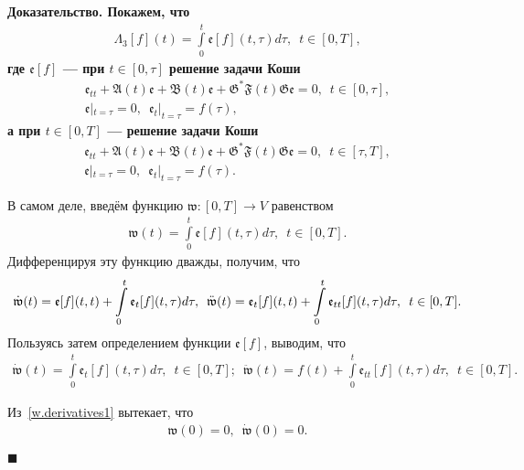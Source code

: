 \documentclass{report}
\newenvironment{Proof}{\par\noindent\bf Доказательство.\rm}{ $\blacksquare$\par}
\begin{document}
\begin{Proof}
Покажем, что
\begin{gather}\label{Lambda.3.repres}
\Lambda_3[f](t)=\int\limits_0^t\mathfrak{e}[f](t,\tau)d\tau,\,\,\,t\in[0,T],
\end{gather}
где $\mathfrak{e}[f]$ ---  при $t\in[0,\tau]$ решение задачи Коши
\begin{gather}\label{abstrChauchyprobeq:nonaut:parametric:homogenious.eq.e!t.less.than.tau}
{\mathfrak{e}}_{tt}+\mathfrak{A}(t){\mathfrak{e}}+\mathfrak{B}(t){\mathfrak{e}} + \mathfrak{G}^*\mathfrak{F}(t)\mathfrak{G}{\mathfrak{e}} = 0,\,\,\,t\in[0,\tau],\\
\label{abstrChauchyprobinitcond:nonaut:parametric:homogenious.eq.e!t.less.than.tau}
{\mathfrak{e}}|_{t=\tau}=0,\,\,\,{\mathfrak{e}}_t|_{t=\tau}=f(\tau),
\end{gather}
а при $t\in[0,T]$ --- решение задачи Коши
\begin{gather}\label{abstrChauchyprobeq:nonaut:parametric:homogenious.eq.e!t.greater.than.tau}
{\mathfrak{e}}_{tt}+\mathfrak{A}(t){\mathfrak{e}}+\mathfrak{B}(t){\mathfrak{e}} + \mathfrak{G}^*\mathfrak{F}(t)\mathfrak{G}{\mathfrak{e}} = 0,\,\,\,t\in[\tau,T],\\
\label{abstrChauchyprobinitcond:nonaut:parametric:homogenious.eq.e!t.greater.than.tau}
{\mathfrak{e}}|_{t=\tau}=0,\,\,\,{\mathfrak{e}}_t|_{t=\tau}=f(\tau).
\end{gather}

В самом деле, введём функцию $\mathfrak{w}:[0,T]\to V$ равенством
\begin{gather*}
\mathfrak{w}(t)=\int\limits_0^t\mathfrak{e}[f](t,\tau)d\tau,\,\,\,t\in[0,T].
\end{gather*}
Дифференцируя эту функцию дважды, получим, что
\begin{gather*}
\dot{\mathfrak{w}}(t)=\mathfrak{e}[f](t,t)+\int\limits_0^t\mathfrak{e}_t[f](t,\tau)d\tau,\,\,\,
\notag\ddot{\mathfrak{w}}(t)=\mathfrak{e}_t[f](t,t)+\int\limits_0^t\mathfrak{e}_{tt}[f](t,\tau)d\tau,\,\,\,t\in[0,T].
\end{gather*}
Пользуясь затем определением функции $\mathfrak{e}[f]$, выводим, что
\begin{gather}\label{w.derivatives1}
\dot{\mathfrak{w}}(t)=\int\limits_0^t\mathfrak{e}_t[f](t,\tau)d\tau,\,\,\,t\in[0,T];\,\,\,\ddot{\mathfrak{w}}(t)=f(t)+\int\limits_0^t\mathfrak{e}_{tt}[f](t,\tau)d\tau,\,\,\,t\in[0,T].
\end{gather}

Из~\eqref{w.derivatives1} вытекает, что
\begin{gather}\label{w.initial.conds}
\mathfrak{w}(0)=0,\,\,\,\dot{\mathfrak{w}}(0)=0.
\end{gather}


\end{Proof}
\end{document}
